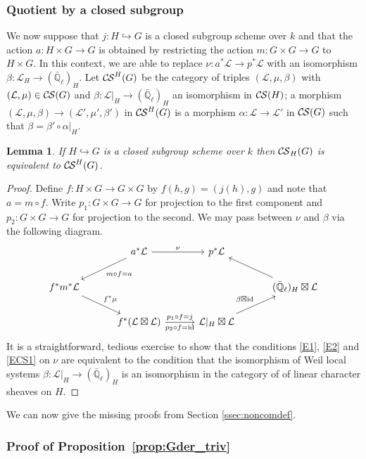 \documentclass[10pt]{amsart}
\theoremstyle{plain}
\newtheorem{lemma}[theorem]{Lemma}
\theoremstyle{definition}
\newcommand{\EE}{\mathbb{\bar Q}_\ell}
\newcommand{\Fq}{k}
\DeclareMathOperator{\id}{id}
\newcommand{\cs}[1]{{\mathcal{#1}}}
\newcommand{\CS}{{\mathcal{C\hskip-0.8pt S}}}
\begin{document}
\subsubsection{Quotient by a closed subgroup}\label{ssec:closed}

We now suppose that $j : H \hookrightarrow G$ is a closed subgroup scheme over $\Fq$
and that the action $a : H\times G\to G$ is obtained by restricting the action
$m : G \times G\to G$ to $H\times G$.  In this context, we are able to replace
$\nu : a^*\cs{L} \to p^*\cs{L}$ with an isomorphism $\beta : \cs{L}_H \to (\EE)_H$.
Let $\CS^H(G)$ be the category of triples $(\cs{L},\mu,\beta)$ with $(\cs{L},\mu) \in \CS(G)$
and $\beta : \cs{L}\vert_H \to (\EE)_H$ an isomorphism in $\CS(H)$;
a morphism $(\cs{L},\mu,\beta) \to (\cs{L}',\mu',\beta')$ in $\CS^H(G)$ is a morphism
$\alpha: \cs{L} \to \cs{L}'$ in $\CS(G)$ such that $\beta = \beta' \circ \alpha\vert_{H}$.

\begin{lemma}\label{lem:beta}
If $H\hookrightarrow G$ is a closed subgroup scheme over $\Fq$ then $\CS_H(G)$ is equivalent to $\CS^H(G)$.
\end{lemma}
\begin{proof}
Define $f : H\times G \to G\times G$ by $f(h,g) = (j(h),g)$ and note that $a = m\circ f$.
Write $p_1: G\times G\to G$ for projection to the first component and $p_2 : G\times G \to G$ for projection to the second.
We may pass between $\nu$ and $\beta$ via the following diagram.
\[
\begin{tikzcd}[column sep=30]
\ & a^*\cs{L} \arrow{dl}{m\circ f = a} \arrow{r}{\nu} & p^*\cs{L} & \\
f^* m^*\cs{L} \arrow{dr}{f^*\mu} &&& (\EE)_{H} \boxtimes \cs{L} \arrow{ul} \\ 
& f^*(\cs{L}\boxtimes \cs{L}) \arrow{r}{p_1 \circ f = j}[swap]{p_2\circ f = \id}  & 
\cs{L}\vert_{H} \boxtimes \cs{L} \arrow{ur}{\beta\boxtimes \id} & 
\end{tikzcd}
\]
It is a straightforward, tedious exercise to show that the conditions \eqref{E1}, \eqref{E2} and \eqref{ECS1} 
on $\nu$ are equivalent to the condition that the isomorphism of Weil local systems
$\beta : \cs{L}\vert_{H} \to (\EE)_{H}$ is an isomorphism in the category of of linear character sheaves on $H$.
\end{proof}

We can now give the missing proofs from Section \ref{ssec:noncomdef}.

\subsubsection{Proof of Proposition~\ref{prop:Gder_triv}}\label{ssec:proof1}
\end{document}
